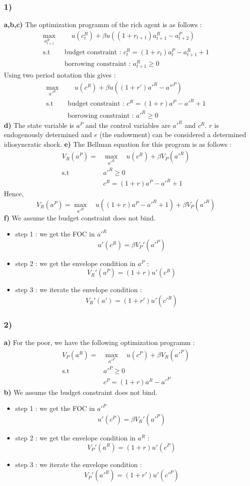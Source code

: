 \documentclass{article}
\begin{document}
\subsubsection{1)}
\textbf{a,b,c)}
The optimization programm of the rich agent is as follows : 
$$\begin{aligned}
    \max_{a_{t+1}^R}& \quad u(c_t^R)+\beta u((1+r_{t+1})a^R_{t+1}-a_{t+2}^P)\\
    \text{s.t }\quad &\text{budget constraint : } c_t^R = (1+r_t)a^P_t-a_{t+1}^R+1\\
    &\text{borrowing constraint : } a_{t+1}^R  \geq 0
\end{aligned}$$
Using two period notation this gives : 
$$\begin{aligned}
    \max_{a'^R}& \quad u(c^R)+\beta u((1+r')a'^R-a''^P)\\
    \text{s.t }\quad &\text{budget constraint : } c^R = (1+r)a^P-a'^R+1\\
    &\text{borrowing constraint : } a'^R \geq 0
\end{aligned}$$
\textbf{d)}
The state variable is $a^P$ and the control variables are $a'^R$ and $c^R$. $r$ is endogenously determined and $e$ (the endowment) can be considered a determined idiosyncratic shock. 
\textbf{e)}
The Bellman equation for this program is as follows : 
$$\begin{aligned}
    V_R(a^P) = &\max_{a'^R}\quad u(c^R)+\beta V_P(a'^R)\\
    \text{s.t} \quad &a'^R \geq  0\\
    &c^R=(1+r)a^P-a'^R+1
\end{aligned} $$
Hence, 
$$V_R(a^P) = \max_{a'^R}\quad u((1+r)a^P-a'^R+1)+\beta V_P(a'^R)$$
\textbf{f)}
We assume the budget constraint does not bind.
\begin{itemize}
    \item step 1 : we get the FOC in $a'^R$
    $$u'(c^R)=\beta V_P'(a'^P)$$
    \item step 2 : we get the envelope condition in $a^P$ : 
    $$V_R'(a^P) = (1+r)u'(c^R)$$
    \item step 3 : we iterate the envelope condition : 
    $$V_R'(a')=(1+r')u'(c'^R)$$
\end{itemize}
\subsubsection{2)}
\textbf{a)}
For the poor, we have the following optimization programm : 
$$\begin{aligned}
    V_P(a^R) = &\max_{a'^P}\quad u(c^P)+\beta V_R(a'^P)\\
    \text{s.t} \quad &a'^P \geq  0\\
    &c^P=(1+r)a^R-a'^P
\end{aligned} $$
\textbf{b)}
We assume the budget constraint does not bind.
\begin{itemize}
    \item step 1 : we get the FOC in $a'^P$
    $$u'(c^P)=\beta V_R'(a'^P)$$
    \item step 2 : we get the envelope condition in $a^R$ : 
    $$V_P'(a^R) = (1+r)u'(c^P)$$
    \item step 3 : we iterate the envelope condition : 
    $$V_P'(a'^R)=(1+r')u'(c'^P)$$
\end{itemize}
\end{document}

